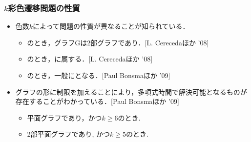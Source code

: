 \begin{frame}\frametitle{$k$彩色遷移問題の性質}

  \begin{itemize}
    \item 色数$k$によって問題の性質が異なることが知られている．
    \begin{itemize}
      \item {}のとき，グラフGは2部グラフであり．[L. Cerecedaほか '08]
      \item {}のとき，に属する．[L. Cerecedaほか '08]
      \item {}のとき，一般にとなる．[Paul Bonsmaほか '09]
    \end{itemize}

    \item グラフの形に制限を加えることにより，多項式時間で解決可能となるものが存在することがわかっている．[Paul Bonsmaほか '09]
    \begin{itemize}
      \item 平面グラフであり，かつ$k \ge 6$のとき.
      \item 2部平面グラフであり, かつ$k \ge 5$のとき.
    \end{itemize}

  \end{itemize}

\end{frame}

\begin{comment}

\begin{frame}{クラスPSPACE}
  \begin{itemize}
    \item 計算量のクラスの一つ.
    \item 決定性チューリングマシンに多項式量のメモリを与えることで解決できる問題が属する.
    \item 指数時間で解くことが可能．
    \item P$\subseteq$NP$\subseteq$PSPACEであることはわかっている.
    \begin{itemize}
      \item ただし, 真に包含するかは未解決.
    \end{itemize}
  \end{itemize}
\end{frame}
\end{comment}

